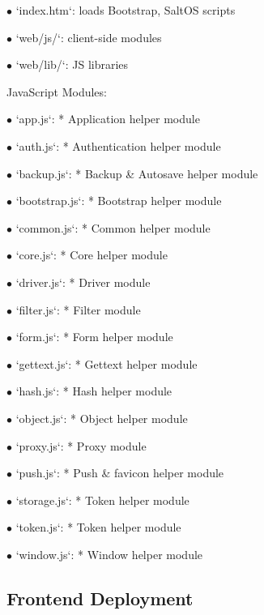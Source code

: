 \documentclass[a4paper]{article}
\begin{document}
\begin{compactitem}
\item[\color{myblue}$\bullet$] `index.htm`: loads Bootstrap, SaltOS scripts
\item[\color{myblue}$\bullet$] `web/js/`: client-side modules
\item[\color{myblue}$\bullet$] `web/lib/`: JS libraries
\end{compactitem}

JavaScript Modules:

\begin{compactitem}
\item[\color{myblue}$\bullet$] `app.js`: * Application helper module
\item[\color{myblue}$\bullet$] `auth.js`: * Authentication helper module
\item[\color{myblue}$\bullet$] `backup.js`: * Backup \& Autosave helper module
\item[\color{myblue}$\bullet$] `bootstrap.js`: * Bootstrap helper module
\item[\color{myblue}$\bullet$] `common.js`: * Common helper module
\item[\color{myblue}$\bullet$] `core.js`: * Core helper module
\item[\color{myblue}$\bullet$] `driver.js`: * Driver module
\item[\color{myblue}$\bullet$] `filter.js`: * Filter module
\item[\color{myblue}$\bullet$] `form.js`: * Form helper module
\item[\color{myblue}$\bullet$] `gettext.js`: * Gettext helper module
\item[\color{myblue}$\bullet$] `hash.js`: * Hash helper module
\item[\color{myblue}$\bullet$] `object.js`: * Object helper module
\item[\color{myblue}$\bullet$] `proxy.js`: * Proxy module
\item[\color{myblue}$\bullet$] `push.js`: * Push \& favicon helper module
\item[\color{myblue}$\bullet$] `storage.js`: * Token helper module
\item[\color{myblue}$\bullet$] `token.js`: * Token helper module
\item[\color{myblue}$\bullet$] `window.js`: * Window helper module
\end{compactitem}

\hypertarget{toc19}{}
\subsection{Frontend Deployment}
\end{document}
